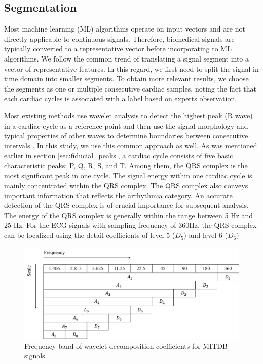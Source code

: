 \subsection{Segmentation}

Most machine learning (ML) algorithms operate on input vectors and are not directly applicable to continuous signals. Therefore, biomedical signals are typically converted to a representative vector before incorporating to ML algorithms. We follow the common trend of translating a signal segment into a vector of representative features. In this regard, we first need to split the signal in time domain into smaller segments. To obtain more relevant results, we choose the segments as one or multiple consecutive cardiac samples, noting the fact that each cardiac cycles is associated with a label based on experts observation. 

Most existing methods use wavelet analysis to detect the highest peak (R wave) in a cardiac cycle as a reference point and then use the signal morphology and typical properties of other waves to determine boundaries between consecutive intervals \textcolor{black}{\cite{banerjee2012delineation,2012qrs,fs,jambukia2015classification}}. In this study, we use this common approach as well. As was mentioned earlier in section \ref{sec:fiducial_peaks}, a cardiac cycle consists of five basic characteristic peaks: P, Q, R, S, and T. Among them, the QRS complex is the most significant peak in one cycle. The signal energy within one cardiac cycle is mainly concentrated within the QRS complex. The QRS complex also conveys important information that reflects the arrhythmia category\cite{2012qrs}. An accurate detection of the QRS complex is of crucial importance for subsequent analysis. The energy of the QRS complex is generally within the range between 5 Hz and 25 Hz. For the ECG signals with sampling frequency of 360Hz, the QRS complex can be localized using the detail coefficients of level 5 ($D_5$) and level 6 ($D_6$)

\begin{figure}[t]
\centering
\includegraphics[scale=.5]{Fig/scale_wavelet.png}
\caption{Frequency band of wavelet decomposition coefficients for MITDB signals.}
\label{fig:wavelet_decomp}
\end{figure}


